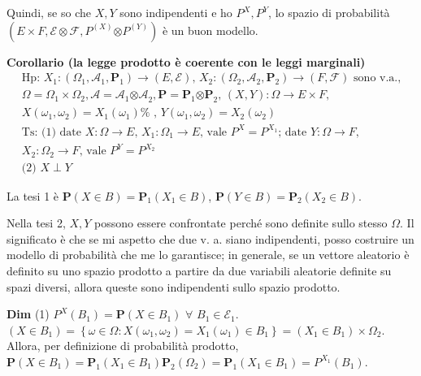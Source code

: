 \documentclass{article}
\begin{document}
Quindi, se so che $X,Y$ sono indipendenti e ho $P^{X},P^{Y}$, lo spazio di
probabilit\`{a} $\left( E\times F,\mathcal{E\otimes F},P^{\left( X\right) }%
\mathcal{\otimes }P^{\left( Y\right) }\right) $ \`{e} un buon modello.

\textbf{Corollario (la legge prodotto \`{e} coerente con le leggi marginali)}%
\begin{gather*}
\text{Hp: }X_{1}:\left( \Omega _{1},\mathcal{A}_{1},\mathbf{P}_{1}\right)
\rightarrow \left( E,\mathcal{E}\right) \text{, }X_{2}:\left( \Omega _{2},%
\mathcal{A}_{2},\mathbf{P}_{2}\right) \rightarrow \left( F,\mathcal{F}%
\right) \text{ sono v.a.,} \\
\Omega =\Omega _{1}\times \Omega _{2},\mathcal{A=A}_{1}\mathcal{\otimes A}%
_{2},\mathbf{P=P}_{1}\mathbf{\otimes P}_{2}\text{, }\left( X,Y\right)
:\Omega \rightarrow E\times F\text{, } \\
X\left( \omega _{1},\omega _{2}\right) =X_{1}\left( \omega _{1}\right) \text{%
, }Y\left( \omega _{1},\omega _{2}\right) =X_{2}\left( \omega _{2}\right) \\
\text{Ts: (1) date }X:\Omega \rightarrow E\text{, }X_{1}:\Omega
_{1}\rightarrow E\text{, vale }P^{X}=P^{X_{1}}\text{; date }Y:\Omega
\rightarrow F\text{,} \\
X_{2}:\Omega _{2}\rightarrow F\text{, vale }P^{Y}=P^{X_{2}} \\
\text{(2) }X\perp Y
\end{gather*}

La tesi 1 \`{e} $\mathbf{P}\left( X\in
B\right) =\mathbf{P}_{1}\left( X_{1}\in B\right) $, $\mathbf{P}\left( Y\in
B\right) =\mathbf{P}_{2}\left( X_{2}\in B\right) $.

Nella tesi 2, $X,Y$ possono essere confrontate perch\'{e} sono definite
sullo stesso $\Omega $. Il significato \`{e} che se mi aspetto che due v. a.
siano indipendenti, posso costruire un modello di probabilit\`{a} che me lo
garantisce; in generale, se un vettore aleatorio \`{e} definito su uno
spazio prodotto a partire da due variabili aleatorie definite su spazi
diversi, allora queste sono indipendenti sullo spazio prodotto.

\textbf{Dim} (1) $P^{X}\left( B_{1}\right) =\mathbf{P}\left( X\in
B_{1}\right) $ $\forall $ $B_{1}\in \mathcal{E}_{1}$. $\left( X\in
B_{1}\right) =\left\{ \omega \in \Omega :X\left( \omega _{1},\omega
_{2}\right) =X_{1}\left( \omega _{1}\right) \in B_{1}\right\} =\left(
X_{1}\in B_{1}\right) \times \Omega _{2}$. Allora, per definizione di
probabilit\`{a} prodotto, $\mathbf{P}\left( X\in B_{1}\right) =\mathbf{P}%
_{1}\left( X_{1}\in B_{1}\right) \mathbf{P}_{2}\left( \Omega _{2}\right) =%
\mathbf{P}_{1}\left( X_{1}\in B_{1}\right) =P^{X_{1}}\left( B_{1}\right) $.
\end{document}
